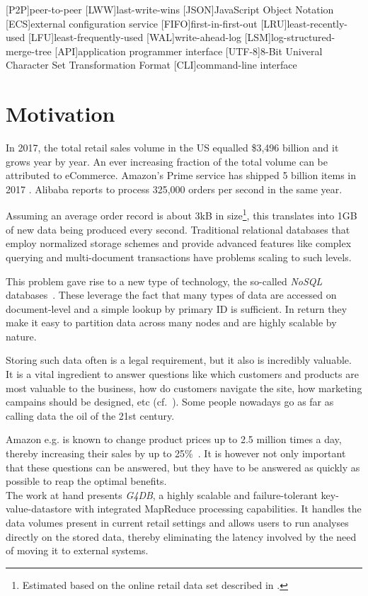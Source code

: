 \begin{acronym}
	[P2P]{peer-to-peer}
	[LWW]{last-write-wins}
	[JSON]{JavaScript Object Notation}
	[ECS]{external configuration service}
	[FIFO]{first-in-first-out}
	[LRU]{least-recently-used}
	[LFU]{least-frequently-used}
	[WAL]{write-ahead-log}
	[LSM]{log-structured-merge-tree}
	[API]{application programmer interface}
	[UTF-8]{8-Bit Univeral Character Set Transformation Format}
	[CLI]{command-line interface}
\end{acronym}

\section{Motivation}
In 2017, the total retail sales volume in the US equalled \$3,496 billion \cite{Ali2018} and it grows year by year.
An ever increasing fraction of the total volume can be attributed to eCommerce.
Amazon's Prime service has shipped 5 billion items in 2017 \cite{Carman2018}.
Alibaba reports to process 325,000 orders per second \cite{Fenol2018} in the same year.

Assuming an average order record is about 3kB in size\footnote{Estimated based on the online retail data set described in \cite{Chen2012}.},
this translates into 1GB of new data being produced every second.
Traditional relational databases that employ normalized storage schemes and provide advanced
features like complex querying and multi-document transactions have problems scaling to such levels.

This problem gave rise to a new type of technology, the so-called \emph{NoSQL} databases~\cite{Kleppmann2017}.
These leverage the fact that many types of data are accessed on document-level and a simple lookup by primary ID is sufficient.
In return they make it easy to partition data across many nodes and are highly scalable by nature.%

Storing such data often is a legal requirement, but it also is incredibly valuable.
It is a vital ingredient to answer questions like which customers and products
are most valuable to the business, how do customers navigate the site, how marketing
campains should be designed, etc (cf.~\cite{Chen2012}).
Some people nowadays go as far as calling data the oil of the 21st century.

Amazon e.g. is known to change product prices up to 2.5 million times a day,
thereby increasing their sales by up to 25\%~\cite{Mehta2018}.
It is however not only important that these questions can be answered, but they have to be
answered as quickly as possible to reap the optimal benefits.
\\[1em]
The work at hand presents \emph{G4DB}, a highly scalable and failure-tolerant key-value-datastore 
with integrated MapReduce processing capabilities.
It handles the data volumes present in current retail settings and allows users
to run analyses directly on the stored data, thereby eliminating the latency involved
by the need of moving it to external systems.


